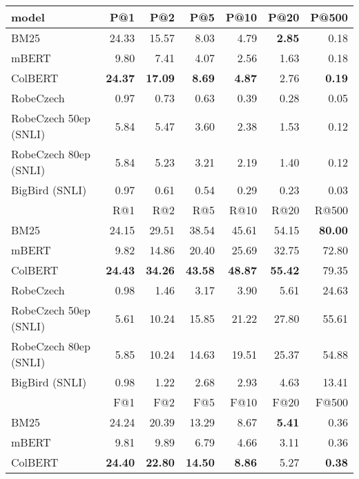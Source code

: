 \begin{table}[!htb]
    \centering
    \begin{tabular}{lrrrrrr}
        \toprule
           model &    P@1 &    P@2 &    P@5 &   P@10 &  P@20 &  P@500 \\
        \midrule
                 BM25 &  24.33 &  15.57 &  8.03 &  4.79 &  \bf{2.85} &   0.18 \\
                mBERT &   9.80 &   7.41 &  4.07 &  2.56 &  1.63 &   0.18 \\
              ColBERT &  \bf{24.37} &  \bf{17.09} &  \bf{8.69} &  \bf{4.87} &  2.76 &   \bf{0.19} \\
            RobeCzech &   0.97 &   0.73 &  0.63 &  0.39 &  0.28 &   0.05 \\
RobeCzech 50ep (SNLI) &   5.84 &   5.47 &  3.60 &  2.38 &  1.53 &   0.12 \\
RobeCzech 80ep (SNLI) &   5.84 &   5.23 &  3.21 &  2.19 &  1.40 &   0.12 \\
       BigBird (SNLI) &   0.97 &   0.61 &  0.54 &  0.29 &  0.23 &   0.03 \\
        \midrule
           {}    &    R@1 &    R@2 &    R@5 &   R@10 &   R@20 &  R@500 \\
        \midrule
                 BM25 &  24.15 &  29.51 &  38.54 &  45.61 &  54.15 &  \bf{80.00} \\
                mBERT &   9.82 &  14.86 &  20.40 &  25.69 &  32.75 &  72.80 \\
              ColBERT &  \bf{24.43} &  \bf{34.26} &  \bf{43.58} &  \bf{48.87} &  \bf{55.42} &  79.35 \\
            RobeCzech &   0.98 &   1.46 &   3.17 &   3.90 &   5.61 &  24.63 \\
RobeCzech 50ep (SNLI) &   5.61 &  10.24 &  15.85 &  21.22 &  27.80 &  55.61 \\
RobeCzech 80ep (SNLI) &   5.85 &  10.24 &  14.63 &  19.51 &  25.37 &  54.88 \\
       BigBird (SNLI) &   0.98 &   1.22 &   2.68 &   2.93 &   4.63 &  13.41 \\
        \midrule
           {}    &    F@1 &    F@2 &    F@5 &   F@10 &   F@20 &   F@500 \\
        \midrule
                BM25 &  24.24 &  20.39 &  13.29 &   8.67 &   \bf{5.41} &    0.36 \\
                mBERT &   9.81 &   9.89 &   6.79 &   4.66 &   3.11 &    0.36 \\
              ColBERT &  \bf{24.40} &  \bf{22.80} &  \bf{14.50} &   \bf{8.86} &   5.27 &    \bf{0.38} \\

\end{tabular}
\end{table}

